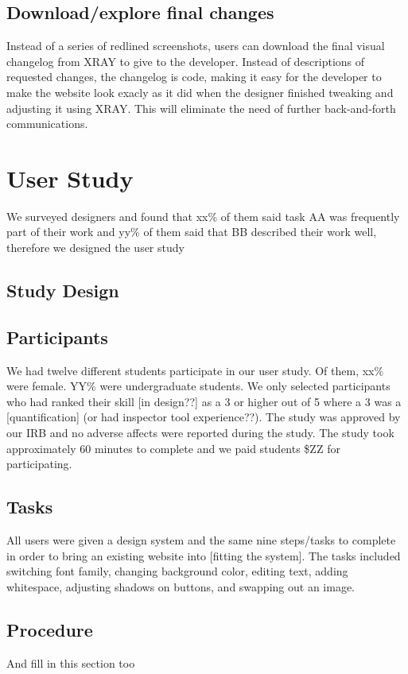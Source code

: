 \documentclass{sigchi}
\newcommand{\xray}{XRAY\xspace}
\begin{document}
\subsection{Download/explore final changes}
Instead of a series of redlined screenshots, users can download the final visual changelog from \xray to give to the developer. Instead of descriptions of requested changes, the changelog is code, making it easy for the developer to make the website look exacly as it did when the designer finished tweaking and adjusting it using \xray. This will eliminate the need of further back-and-forth communications. 

\section{User Study}
We surveyed designers and found that xx\% of them said task AA was frequently part of their work and yy\% of them said that BB described their work well, therefore we designed the user study 
\subsection{Study Design}

\subsection{Participants}
We had twelve different students participate in our user study. Of them, xx\% were female. YY\% were undergraduate students. We only selected participants who had ranked their skill [in design??] as a 3 or higher out of 5 where a 3 was a [quantification] (or had inspector tool experience??). The study was approved by our IRB and no adverse affects were reported during the study. The study took approximately 60 minutes to complete and we paid students \$ZZ for participating. 


\subsection{Tasks}
All users were given a design system and the same nine steps/tasks to complete in order to bring an existing website into [fitting the system]. The tasks included switching font family, changing background color, editing text, adding whitespace, adjusting shadows on buttons, and swapping out an image. 


\subsection{Procedure}
And fill in this section too
\end{document}
